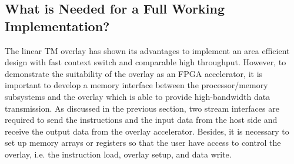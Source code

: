 \subsection{What is Needed for a Full Working Implementation?}
The linear TM overlay has shown its advantages to implement an area efficient design with fast context switch and comparable high throughput. 
However, to demonstrate the suitability of the overlay as an FPGA accelerator, it is important to develop a memory interface between the processor/memory subsystems and the overlay which is able to provide high-bandwidth data transmission. 
As discussed in the previous section, two stream interfaces are required to send the instructions and the input data from the host side and receive the output data from the overlay accelerator. 
Besides, it is necessary to set up memory arrays or registers so that the user have access to control the overlay, i.e. the instruction load, overlay setup, and data write. 


